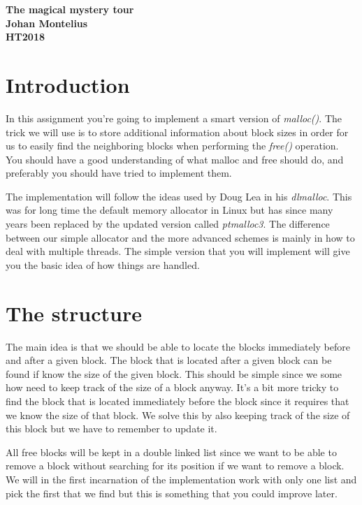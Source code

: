 \documentclass[a4paper,11pt]{article}
\begin{document}
\begin{center} \vspace{20pt} \textbf{\large The magical mystery tour}\\
\vspace{10pt} \textbf{Johan Montelius}\\ \vspace{10pt} \textbf{HT2018}
\end{center}


\section{Introduction}

In this assignment you're going to implement a smart version of {\em
  malloc()}. The trick we will use is to store additional information
about block sizes in order for us to easily find the neighboring
blocks when performing the {\em free()} operation. You should have a
good understanding of what malloc and free should do, and preferably
you should have tried to implement them.

The implementation will follow the ideas used by Doug Lea in his {\em
  dlmalloc}. This was for long time the default memory allocator in
Linux but has since many years been replaced by the updated version
called {\em ptmalloc3}. The difference between our simple allocator
and the more advanced schemes is mainly in how to deal with multiple
threads. The simple version that you will implement will give you the
basic idea of how things are handled.

\section{The structure}

The main idea is that we should be able to locate the blocks
immediately before and after a given block. The block that is located
after a given block can be found if know the size of the given
block. This should be simple since we some how need to keep track of
the size of a block anyway. It's a bit more tricky to find the block
that is located immediately before the block since it requires that we
know the size of that block. We solve this by also keeping track of
the size of this block but we have to remember to update it.


All free blocks will be kept in a double linked list since we want to
be able to remove a block without searching for its position if we
want to remove a block. We will in the first incarnation of the
implementation work with only one list and pick the first that we find
but this is something that you could improve later.
\end{document}
